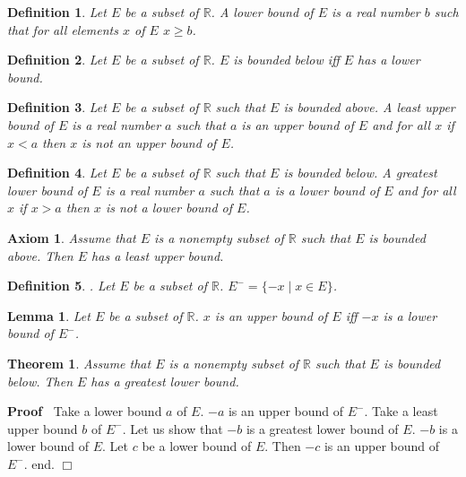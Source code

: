 \documentclass{article}
\newenvironment{forthel}{\begin{leftbar}}{\end{leftbar}}
\newenvironment{proof}{\noindent\textbf{Proof\ }}{\hspace*{\fill}$\Box$\medskip}
\newtheorem{axiom}{Axiom}
\newtheorem{lemma}{Lemma}
\newtheorem{theorem}{Theorem}
\newtheorem{definition}{Definition}
\begin{document}
\begin{forthel}
\begin{definition} Let $E$ be a subset of $\mathbb{R}$. 
A \emph{lower bound} of $E$ is a
real number $b$ such that for all elements $x$ of $E$ $x \geq b$.
\end{definition}

\begin{definition} Let $E$ be a subset of $\mathbb{R}$. 
$E$ is \emph{bounded below} iff
$E$ has a lower bound.\end{definition}

\begin{definition} Let $E$ be a subset of $\mathbb{R}$ such that $E$ is bounded above.
A \emph{least upper bound} of $E$ is a real number $a$ such that
$a$ is an upper bound of $E$ and for all $x$ if $x < a$ then $x$ 
is not an upper bound of $E$.\end{definition}

\begin{definition} Let $E$ be a subset of $\mathbb{R}$ such that $E$ 
is bounded below.
A \emph{greatest lower bound} of $E$ is a real number $a$ such that
$a$ is a lower bound of $E$ and for all $x$ if $x > a$ then $x$ is 
not a lower bound of $E$.\end{definition}

\begin{axiom} Assume that $E$ is a nonempty subset of $\mathbb{R}$ 
such that $E$ is bounded
above. Then $E$ has a least upper bound.
\end{axiom}

\begin{definition}. Let $E$ be a subset of $\mathbb{R}$. 
$E^- = \{-x \mid x \in E\}$.\end{definition}

\begin{lemma} Let $E$ be a subset of $\mathbb{R}$.
$x$ is an upper bound of $E$ iff $-x$ is a lower bound of $E^-$.
\end{lemma}

\begin{theorem} Assume that $E$ is a nonempty subset of $\mathbb{R}$ 
such that $E$ is bounded below.
Then $E$ has a greatest lower bound.\end{theorem}
\begin{proof}
Take a lower bound $a$ of $E$.
$-a$ is an upper bound of $E^-$.
Take a least upper bound $b$ of $E^-$.
Let us show that $-b$ is a greatest lower bound of $E$.
$-b$ is a lower bound of $E$. Let $c$ be a lower bound of $E$. 
Then $-c$ is an upper bound of $E^-$.
end. \end{proof}

\end{forthel}
\end{document}
